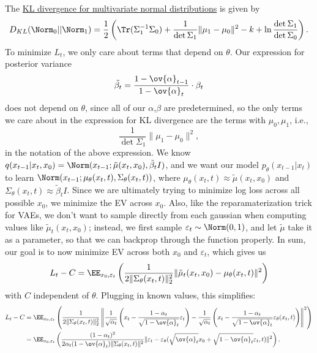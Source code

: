 The \href{https://en.wikipedia.org/wiki/Multivariate_normal_distribution#Kullback%E2%80%93Leibler_divergence}{KL divergence for multivariate normal distributions} is given by 
	\[D_{KL}(\Norm_0 || \Norm_1) = \frac{1}{2}\left(\Tr(\Sigma_1^{-1}\Sigma_0) + \frac{1}{\det \Sigma_1}\lVert \mu_1-\mu_0\rVert^2 - k + \ln \frac{\det \Sigma_1}{\det \Sigma_0}\right).\]
To minimize $L_{t}$, we only care about terms that depend on $\theta$. Our expression for posterior variance 
\[\tilde{\beta_t} = \frac{1-\ov{\alpha}_{t-1}}{1-\ov{\alpha}_t}\cdot \beta_t\]
does not depend on $\theta$, since all of our $\alpha$,$\beta$ are predetermined, so the only terms we care about in the expression for KL divergence are the terms with $\mu_0,\mu_1$, i.e., 
\[\frac{1}{\det \Sigma_1}\lVert \mu_1 - \mu_0\rVert^2,\]
in the notation of the above expression. We know $q(x_{t-1}|x_t,x_0) = \Norm(x_{t-1}; \tilde{\mu}(x_t,x_0), \tilde{\beta}_tI)$, and we want our model $p_{\theta}(x_{t-1}|x_t)$ to learn $\Norm(x_{t-1}; \mu_{\theta}(x_t,t), \Sigma_{\theta}(x_t,t))$, where $\mu_{\theta}(x_t,t)\approx \tilde{\mu}(x_t,x_0)$ and $\Sigma_{\theta}(x_t,t)\approx \tilde{\beta}_t I$. Since we are ultimately trying to minimize log loss across all possible $x_0$, we minimize the EV across $x_0$. Also, like the reparamaterization trick for VAEs, we don't want to sample directly from each gaussian when computing values like $\tilde{\mu}_t(x_t,x_0)$; instead, we first sample $\varepsilon_t\sim \Norm(0,1)$, and let $\tilde{\mu}$ take it as a parameter, so that we can backprop through the function properly. In sum, our goal is to now minimize EV across both $x_0$ and $\varepsilon_t$, which gives us
\[L_{t} - C = \EE_{x_0, \varepsilon_t}\left(\frac{1}{2\lVert\Sigma_{\theta}(x_t,t)\rVert_2^2}\lVert \tilde{\mu}_t(x_t, x_0) - \mu_{\theta}(x_t,t)\rVert^2\right)\] 
with $C$ independent of $\theta$. Plugging in known values, this simplifies: \begin{align*}
	L_t - C &= \EE_{x_0,\varepsilon_t}\left(\frac{1}{2\lVert\Sigma_{\theta}(x_t,t)\rVert_2^2}\left\lVert\frac{1}{\sqrt{\alpha_t}}\left(x_t - \frac{1-\alpha_t}{\sqrt{1-\ov{\alpha}_t}}\varepsilon_t\right) - \frac{1}{\sqrt{\alpha_t}}\left(x_t - \frac{1-\alpha_t}{\sqrt{1-\ov{\alpha}_t}}\varepsilon_{\theta}(x_t,t)\right)\right\rVert^2\right) \\
					&= \EE_{x_0,\varepsilon_t}\left(\frac{(1-\alpha_t)^2}{2\alpha_t(1-\ov{\alpha}_t) \lVert\Sigma_{\theta}(x_t,t)\rVert^2}\lVert\varepsilon_t - \varepsilon_{\theta}(\sqrt{\ov{\alpha}_t}x_0 + \sqrt{1-\ov{\alpha}_t}\varepsilon_t, t)\rVert^2\right). 
\end{align*} 

